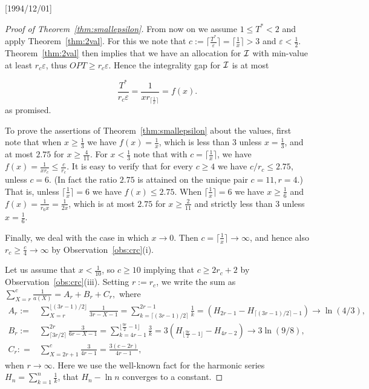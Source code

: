 \NeedsTeXFormat{LaTeX2e}[1994/12/01]\documentclass[letterpaper, 11pt]{article}
\theoremstyle{definition}
\theoremstyle{remark}
\numberwithin{equation}{section}
\begin{document}
\begin{proof}[Proof of Theorem~\ref{thm:smallepsilon}]
From now on we assume $1\leq T^* < 2$ and
apply Theorem~\ref{thm:2val}. For this we note that
$c:= \lceil\frac{T^*}{\varepsilon}\rceil = \lceil \frac1x\rceil > 3$
and $\varepsilon < \frac{1}{2}$.
Theorem~\ref{thm:2val} then implies that we have an
allocation for ${\cal I}$ with min-value at least $r_c\varepsilon$, thus
$OPT\geq r_c\varepsilon$. Hence the integrality gap for ${\cal I}$ is
at most

$$\frac{T^*}{r_c\varepsilon}=\frac{1}{xr_{\lceil\frac1x\rceil}}=f(x).$$
as promised.



To prove the assertions of Theorem~\ref{thm:smallepsilon} about the
values, first note that when $x\geq \frac13$ we have $f(x) = \frac{1}{x}$,
which is less than $3$ unless $x=\frac13$, and at most $2.75$ for
$x\geq \frac{4}{11}$.
For $x < \frac{1}{3}$ note that with $c=\lceil \frac{1}{x}\rceil$,
we have $f(x)=\frac1{xr_c}\leq\frac{c}{r_c}$. It is easy to verify 
that  for every $c\geq 4$ we have $c/r_c \leq 2.75$, unless $c=6$.
(In fact the ratio $2.75$ is attained on the unique pair $c=11, r=4$.) 
That is, unless $\lceil \frac{1}{x}\rceil =6$ we have $f(x) \leq 2.75$. 
When $\lceil \frac{1}{x}\rceil =6$ we have $x\geq \frac{1}{6}$ and
$f(x)=\frac{1}{r_6x} = \frac1{2x}$, which 
is at most $2.75$ for $x \geq \frac{2}{11}$
and strictly less than $3$ unless $x=\frac16$.

Finally, we deal with the case in which  $x \rightarrow 0$.
Then $c=\lceil\frac1x\rceil\rightarrow\infty$, and hence also
$r_{c} \geq \frac{c}{4}\rightarrow\infty$ by
Observation~\ref{obs:crc}(i).  

Let us assume
that $x < \frac{1}{10}$, so $c \geq
10$ implying that $c \geq 2r_{c}
+2$ by Observation~\ref{obs:crc}(iii). Setting $r:=r_c$, we write the sum as
$ \sum_{X=r}^c \frac{1}{a(X)} = A_r + B_r +C_r,$ where
\begin{align*} A_r:=&\sum_{X=r}^{\lfloor (3r-1)/2\rfloor}\frac{1}{3r-X-1} =
\sum_{k=\lceil (3r-1)/2\rceil}^{2r-1}\frac1k = (H_{2r-1}-H_{\lceil
                      (3r-1)/2\rceil -1})\rightarrow \ln(4/3),\\
                      B_r:= & \sum_{\lceil 3r/2\rceil}^{2r}\frac{3}{6r-X-1} =
\sum_{k=4r-1}^{\lfloor \frac{9r}{2}-1\rfloor}\frac3k= 3(H_{\lfloor
                              \frac{9r}{2}-1\rfloor}-H_{4r-2})\rightarrow
                              3\ln(9/8),\\
                              C_r : = & \sum_{X=2r+1}^c \frac{3}{4r-1}
                                        = \frac{3(c-2r)}{4r-1},
\end{align*}
when $r \rightarrow \infty$.
Here we use the well-known fact for the harmonic 
series $H_n=\sum_{k=1}^n\frac1k$, that $H_n-\ln n$
converges to a constant. 


\end{proof}
\end{document}
